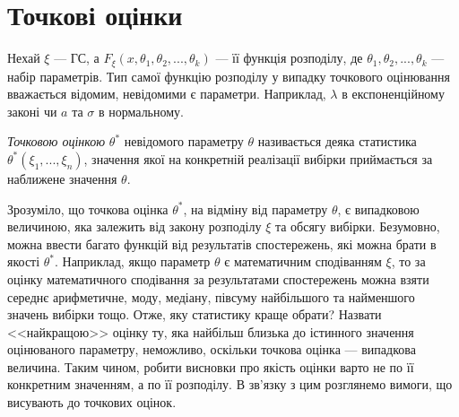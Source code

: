 \section{Точкові оцінки}
Нехай $\xi$ --- ГС, а $F_{\xi}(x, \theta_1, \theta_2, ..., \theta_k)$ --- її функція розподілу, де
$\theta_1, \theta_2, ..., \theta_k$ --- набір параметрів. Тип самої функцію розподілу у випадку точкового оцінювання
вважається відомим, невідомими є параметри. Наприклад, $\lambda$ в експоненційному законі чи $a$ та $\sigma$ в нормальному.
\begin{definition}
    \emph{Точковою оцінкою} $\theta^*$ невідомого параметру $\theta$ називається деяка статистика
    $\theta^*(\xi_1, ..., \xi_n)$, значення якої на конкретній
    реалізації вибірки приймається за наближене значення $\theta$.
\end{definition}
Зрозуміло, що точкова оцінка $\theta^*$, на відміну від параметру $\theta$, є випадковою величиною, 
яка залежить від закону розподілу $\xi$ та обсягу вибірки. Безумовно, можна ввести багато функцій від результатів спостережень, 
які можна брати в якості $\theta^*$. Наприклад, якщо параметр $\theta$ є математичним сподіванням $\xi$, 
то за оцінку математичного сподівання за результатами спостережень можна взяти середнє арифметичне, моду, медіану, 
півсуму найбільшого та найменшого значень вибірки тощо. 
Отже, яку статистику краще обрати? Назвати <<найкращою>> оцінку ту, яка найбільш близька до істинного значення оцінюваного параметру, 
неможливо, оскільки точкова оцінка --- випадкова величина. Таким чином, робити висновки про якість оцінки варто не по її конкретним значенням, 
а по її розподілу. В зв'язку з цим розглянемо вимоги, що висувають до точкових оцінок.

